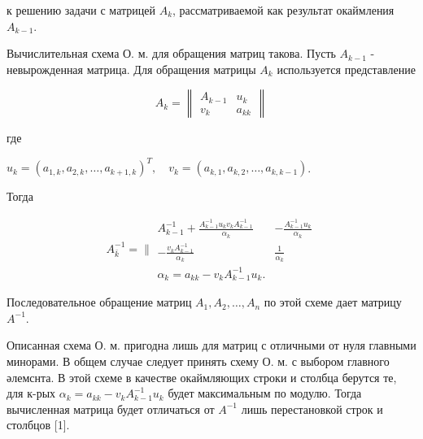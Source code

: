 \documentclass[10pt]{article}
\begin{document}
к решению задачи с матрицей $A_{k}$, рассматриваемой как результат окаймления $A_{k-1}$.



Вычислительная схема О. м. для обращения матриц такова. Пусть $A_{k-1}$ - невырожденная матрица. Для обращения матрицы $A_{k}$ используется представление



\[

A_{k}=\left\|\begin{array}{cc}

A_{k-1} & u_{k} \\

v_{k} & a_{k k}

\end{array}\right\|

\]



где



$u_{k}=\left(a_{1, k}, a_{2, k}, \ldots, a_{k+1, k}\right)^{T}, \quad v_{k}=\left(a_{k, 1}, a_{k, 2}, \ldots, a_{k, k-1}\right)$.



Тогда



\[

A_{\bar{k}}^{-1}=\| \begin{array}{cc}

A_{k-1}^{-1}+\frac{A_{k-1}^{-1} u_{k} v_{k} A_{k-1}^{-1}}{\alpha_{k}} & -\frac{A_{k-1}^{-1} u_{k}}{\alpha_{k}} \\

-\frac{v_{k} A_{k-1}^{-1}}{\alpha_{k}} & \frac{1}{\alpha_{k}} \\

\alpha_{k}=a_{k k}-v_{k} A_{k-1}^{-1} u_{k} .

\end{array}

\]



Последовательное обращение матриц $A_{1}, A_{2}, \ldots, A_{n}$ по этой схеме дает матрицу $A^{-1}$.



Описанная схема О. м. пригодна лишь для матриц с отличными от нуля главными минорами. В общем случае следует принять схему О. м. с выбором главного әлемснта. В этой схеме в качестве окаймляющих строки и столбца берутся те, для к-рых $\alpha_{k}=a_{k k}-v_{k} A_{k-1}^{-1} u_{k}$ будет максимальным по модулю. Тогда вычисленная матрица будет отличаться от $A^{-1}$ лишь перестановкой строк и столбцов [1].
\end{document}
